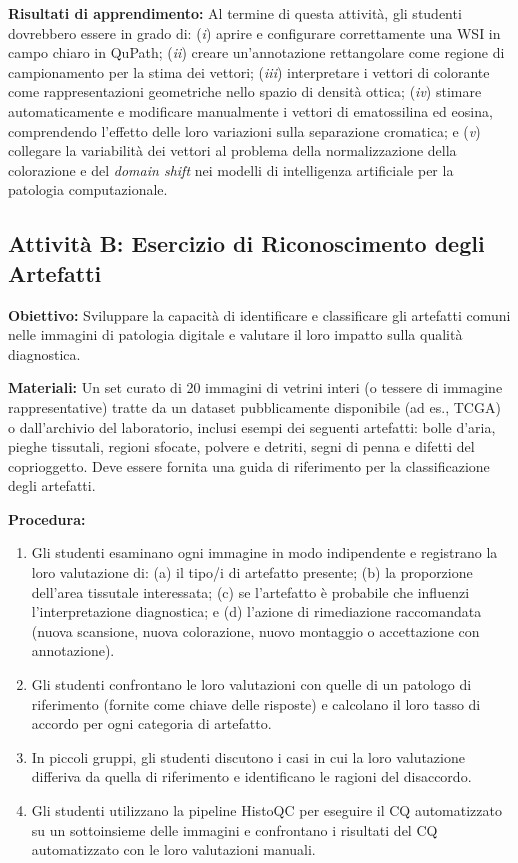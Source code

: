 \textbf{Risultati di apprendimento:} Al termine di questa attività, gli studenti dovrebbero
essere in grado di: (\textit{i}) aprire e configurare correttamente una WSI in campo chiaro in
QuPath; (\textit{ii}) creare un'annotazione rettangolare come regione di campionamento per la
stima dei vettori; (\textit{iii}) interpretare i vettori di colorante come rappresentazioni
geometriche nello spazio di densità ottica; (\textit{iv}) stimare automaticamente e modificare
manualmente i vettori di ematossilina ed eosina, comprendendo l'effetto delle loro variazioni
sulla separazione cromatica; e (\textit{v}) collegare la variabilità dei vettori al problema
della normalizzazione della colorazione e del \emph{domain shift} nei modelli di
intelligenza artificiale per la patologia computazionale.


\subsection{Attività B: Esercizio di Riconoscimento degli Artefatti}

\textbf{Obiettivo:} Sviluppare la capacità di identificare e classificare gli artefatti comuni
nelle immagini di patologia digitale e valutare il loro impatto sulla qualità diagnostica.

\textbf{Materiali:} Un set curato di 20 immagini di vetrini interi (o tessere di immagine
rappresentative) tratte da un dataset pubblicamente disponibile (ad es., TCGA) o dall'archivio
del laboratorio, inclusi esempi dei seguenti artefatti: bolle d'aria, pieghe tissutali, regioni
sfocate, polvere e detriti, segni di penna e difetti del coprioggetto. Deve essere fornita una
guida di riferimento per la classificazione degli artefatti.

\textbf{Procedura:}
\begin{enumerate}
    \item Gli studenti esaminano ogni immagine in modo indipendente e registrano la loro
    valutazione di: (a) il tipo/i di artefatto presente; (b) la proporzione dell'area tissutale
    interessata; (c) se l'artefatto è probabile che influenzi l'interpretazione diagnostica; e
    (d) l'azione di rimediazione raccomandata (nuova scansione, nuova colorazione, nuovo montaggio
    o accettazione con annotazione).

    \item Gli studenti confrontano le loro valutazioni con quelle di un patologo di riferimento
    (fornite come chiave delle risposte) e calcolano il loro tasso di accordo per ogni categoria
    di artefatto.

    \item In piccoli gruppi, gli studenti discutono i casi in cui la loro valutazione differiva
    da quella di riferimento e identificano le ragioni del disaccordo.

    \item Gli studenti utilizzano la pipeline HistoQC \cite{janowczyk2019} per eseguire il CQ
    automatizzato su un sottoinsieme delle immagini e confrontano i risultati del CQ automatizzato
    con le loro valutazioni manuali.
\end{enumerate}

